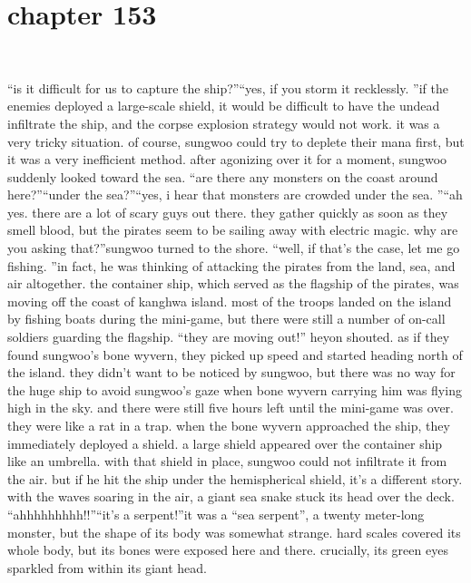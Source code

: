\section{chapter 153}

                             




“is it difficult for us to capture the ship?”“yes, if you storm it recklessly.
”if the enemies deployed a large-scale shield, it would be difficult to have the undead infiltrate the ship, and the corpse explosion strategy would not work.
 it was a very tricky situation.
of course, sungwoo could try to deplete their mana first, but it was a very inefficient method.
after agonizing over it for a moment, sungwoo suddenly looked toward the sea.
“are there any monsters on the coast around here?”“under the sea?”“yes, i hear that monsters are crowded under the sea.
”“ah yes.
 there are a lot of scary guys out there.
 they gather quickly as soon as they smell blood, but the pirates seem to be sailing away with electric magic.
 why are you asking that?”sungwoo turned to the shore.
“well, if that’s the case, let me go fishing.
”in fact, he was thinking of attacking the pirates from the land, sea, and air altogether.
the container ship, which served as the flagship of the pirates, was moving off the coast of kanghwa island.
most of the troops landed on the island by fishing boats during the mini-game, but there were still a number of on-call soldiers guarding the flagship.
“they are moving out!” heyon shouted.
as if they found sungwoo’s bone wyvern, they picked up speed and started heading north of the island.
 they didn’t want to be noticed by sungwoo, but there was no way for the huge ship to avoid sungwoo’s gaze when bone wyvern carrying him was flying high in the sky.
 and there were still five hours left until the mini-game was over.
they were like a rat in a trap.
when the bone wyvern approached the ship, they immediately deployed a shield.
 a large shield appeared over the container ship like an umbrella.
 with that shield in place, sungwoo could not infiltrate it from the air.
but if he hit the ship under the hemispherical shield, it’s a different story.
 with the waves soaring in the air, a giant sea snake stuck its head over the deck.
“ahhhhhhhhh!!”“it’s a serpent!”it was a “sea serpent”, a twenty meter-long monster, but the shape of its body was somewhat strange.
 hard scales covered its whole body, but its bones were exposed here and there.
 crucially, its green eyes sparkled from within its giant head.


